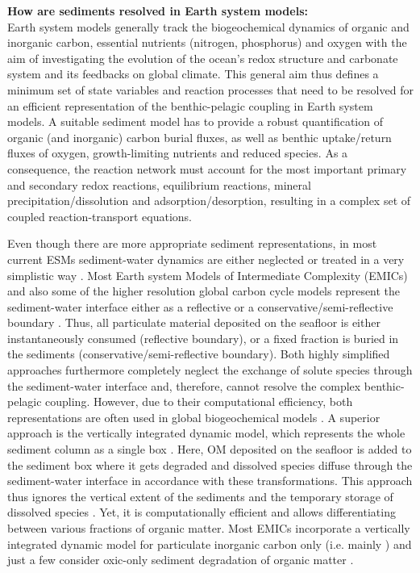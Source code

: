 \documentclass[gmd, manuscript]{copernicus}
\begin{document}

\textbf{How are sediments resolved in Earth system models:}\\
Earth system models generally track the biogeochemical dynamics of organic and inorganic carbon, essential nutrients (nitrogen, phosphorus) and oxygen with the aim of investigating the evolution 
of the ocean's redox structure and carbonate system and its feedbacks on global climate. This general aim thus defines a minimum set of state variables and reaction processes that need to be resolved for an efficient 
representation of the benthic-pelagic coupling in Earth system models. A suitable sediment model has to provide a robust quantification of organic (and inorganic) carbon burial fluxes, as well as 
benthic uptake/return fluxes of oxygen, growth-limiting nutrients and reduced species. As a consequence, the reaction network must account for the most important primary and secondary redox reactions, equilibrium reactions, 
mineral precipitation/dissolution and adsorption/desorption, resulting in a complex set of coupled reaction-transport equations. 

Even though there are more appropriate sediment representations, in most current ESMs sediment-water dynamics are either neglected or treated in a very simplistic way \citep{soetaert_coupling_2000, hulse_understanding_2017}. 
Most Earth system Models of Intermediate Complexity (EMICs) and also some of the higher resolution global carbon cycle models represent the sediment-water interface either as a 
reflective or a conservative/semi-reflective boundary \citep{hulse_understanding_2017}. 
Thus, all particulate material deposited on the seafloor is either instantaneously consumed (reflective boundary), or a fixed fraction is buried in the sediments (conservative/semi-reflective boundary). 
Both highly simplified approaches furthermore completely neglect the exchange of solute species through the sediment-water interface and, therefore, cannot resolve the complex benthic-pelagic coupling. 
However, due to their computational efficiency, both representations are often used in global biogeochemical models \citep[e.g.][]{najjar_impact_2007, ridgwell_marine_2007, goosse_description_2010}. 
A superior approach is the vertically integrated dynamic model, which represents the whole sediment column as a single box \citep{hulse_understanding_2017}. Here, OM deposited on 
the seafloor is added to the sediment box where it gets degraded and dissolved species diffuse through the sediment-water interface in accordance with these transformations. 
This approach thus ignores the vertical extent of the sediments and the temporary storage of dissolved species \citep{soetaert_coupling_2000}. Yet, it is computationally efficient and 
allows differentiating between various fractions of organic matter. Most EMICs incorporate a vertically integrated dynamic model for particulate inorganic carbon only 
(i.e. mainly ) and just a few  consider oxic-only sediment degradation of organic matter \citep{hulse_understanding_2017}. 
\end{document}
